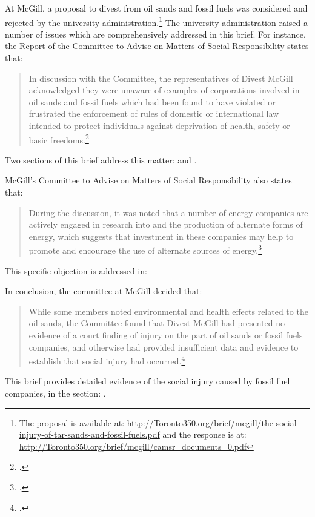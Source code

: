 At McGill, a proposal to divest from oil sands and fossil fuels was considered and rejected by the university administration.\footnote{The proposal is available at: \url{http://Toronto350.org/brief/mcgill/the-social-injury-of-tar-sands-and-fossil-fuels.pdf} and the response is at: \url{http://Toronto350.org/brief/mcgill/camsr_documents_0.pdf}}
The university administration raised a number of issues which are comprehensively addressed in this brief.
For instance, the Report of the Committee to Advise on Matters of Social Responsibility states that:
\begin{quote}
In discussion with the Committee, the representatives of Divest McGill acknowledged they were unaware of examples of corporations involved in oil sands and fossil fuels which had been found to have violated or frustrated the enforcement of rules of domestic or international law intended to protect individuals against deprivation of health, safety or basic freedoms.\footcite[][p. 4]{McGillRejection}
\end{quote}
Two sections of this brief address this matter:  and .



McGill's Committee to Advise on Matters of Social Responsibility also states that:
\begin{quote}
During the discussion, it was noted that a number of energy companies are actively engaged in research into and the production of alternate forms of energy, which suggests that investment in these companies may help to promote and encourage the use of alternate sources of energy.\footcite[][p. 4]{McGillRejection}
\end{quote}
This specific objection is addressed in: 


In conclusion, the committee at McGill decided that:
\begin{quote}
While some members noted environmental and health effects related to the oil sands, the Committee found that Divest McGill had presented no evidence of a court finding of injury on the part of oil sands or fossil fuels companies, and otherwise had provided insufficient data and evidence to establish that social injury had occurred.\footcite[][p. 4]{McGillRejection}
\end{quote}
This brief provides detailed evidence of the social injury caused by fossil fuel companies, in the section: .



